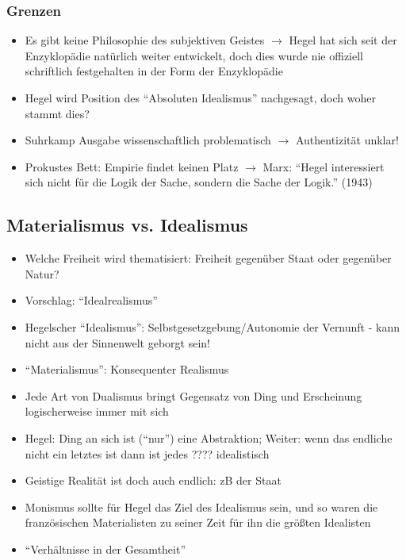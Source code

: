 \documentclass[emulatestandardclasses]{scrartcl}
\begin{document}
\subsubsection{Grenzen}

\begin{itemize}
  \item Es gibt keine Philosophie des subjektiven Geistes $\rightarrow$ Hegel hat sich seit der Enzyklopädie natürlich weiter entwickelt, doch dies wurde nie offiziell schriftlich festgehalten in der Form der Enzyklopädie
  \item Hegel wird Position des "`Absoluten Idealismus"' nachgesagt, doch woher stammt dies?
  \item Suhrkamp Ausgabe wissenschaftlich problematisch $\rightarrow$ Authentizität unklar! 
  \item Prokustes Bett: Empirie findet keinen Platz $\rightarrow$ Marx: "`Hegel interessiert sich nicht für die Logik der Sache, sondern die Sache der Logik."' (1943)
\end{itemize}

\subsection{Materialismus vs. Idealismus}

\begin{itemize}
  \item Welche Freiheit wird thematisiert: Freiheit gegenüber Staat oder gegenüber Natur?
  \item Vorschlag: "`Idealrealismus"'
  \item Hegelscher "`Idealismus"': Selbstgesetzgebung/Autonomie der Vernunft - kann nicht aus der Sinnenwelt geborgt sein!
  \item "`Materialismus"': Konsequenter Realismus
  \item Jede Art von Dualismus bringt Gegensatz von Ding und Erscheinung logischerweise immer mit sich
  \item Hegel: Ding an sich ist ("`nur"') eine Abstraktion; Weiter: wenn das endliche nicht ein letztes ist dann ist jedes ???? idealistisch
  \item Geistige Realität ist doch auch endlich: zB der Staat
  \item Monismus sollte für Hegel das Ziel des Idealismus sein, und so waren die französischen Materialisten zu seiner Zeit für ihn die größten Idealisten
  \item "`Verhältnisse in der Gesamtheit"'
\end{itemize}
\end{document}
